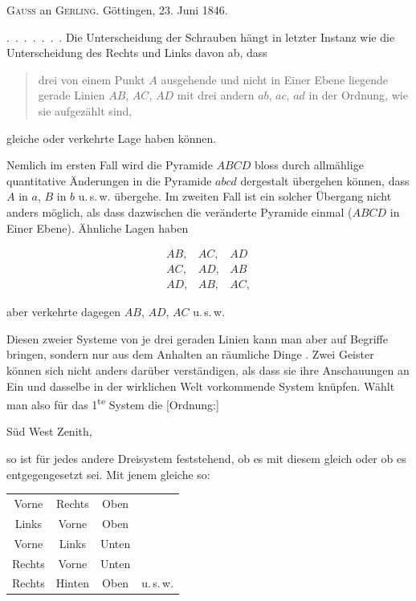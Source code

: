 %
\begin{center}
\textsc{Gauss} an \textsc{Gerling}. G\"ottingen, 23. Juni 1846.
\end{center}

\mbox{.\ .\ .\ .\ .\ .\ .} Die Unterscheidung der Schrauben h\"angt in letzter Instanz wie die Unterscheidung des Rechts und Links davon ab, dass

\begin{quote}
drei von einem Punkt $A$ ausgehende und nicht in Einer Ebene liegende gerade Linien $AB$, $AC$, $AD$ mit drei andern $ab$, $ac$, $ad$ in der Ordnung, wie sie aufgez\"ahlt sind,
\end{quote}

\begin{center}
gleiche oder verkehrte Lage haben k\"onnen.
\end{center}

Nemlich im ersten Fall wird die Pyramide $ABCD$ bloss durch allm\"ahlige quantitative \"Anderungen in die Pyramide $abcd$ dergestalt \"ubergehen k\"onnen, dass $A$ in $a$, $B$ in $b$ u.\,s.\,w. \"ubergehe. Im zweiten Fall ist ein solcher \"Ubergang nicht anders m\"oglich, als dass dazwischen die ver\"anderte Pyramide einmal  ($ABCD$ in Einer Ebene). \"Ahnliche Lagen haben

\[
\begin{array}{ccc}
AB,&AC,&AD\\
AC,&AD,&AB\\
AD,&AB,&AC,
\end{array}
\]

aber verkehrte dagegen $AB$, $AD$, $AC$ u.\,s.\,w.

Diesen  zweier Systeme von je drei geraden Linien kann man aber  auf Begriffe bringen, sondern nur aus dem Anhalten an  r\"aumliche Dinge . Zwei Geister k\"onnen sich nicht anders dar\"uber verst\"andigen, als dass sie ihre Anschauungen an Ein und dasselbe in der wirklichen Welt vorkommende System kn\"upfen. W\"ahlt man also f\"ur das 1\textsuperscript{te} System die [Ordnung:]

\begin{center}
S\"ud \qquad West \qquad Zenith,
\end{center}

so ist f\"ur jedes andere Dreisystem feststehend, ob es mit diesem gleich oder ob es entgegengesetzt sei. Mit jenem gleiche so:

\begin{center}
\begin{tabular}{cccc}
Vorne & Rechts & Oben & \\
Links & Vorne & Oben & \\
Vorne & Links & Unten & \\
Rechts & Vorne & Unten & \\
Rechts & Hinten & Oben & u.\,s.\,w.
\end{tabular}
\end{center}
